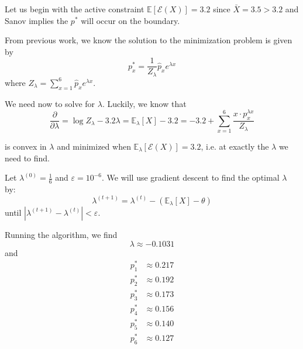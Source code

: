 \documentclass[11pt]{report}
\newcommand{\E}{\mathbb{E}}
\newcommand{\Ec}{\mathcal{E}}
\newcommand{\ep}{\varepsilon}
\newcommand{\abs}[1]{\left\vert #1 \right\vert}
\begin{document}
\begin{enumerate}[1.]
\begin{enumerate}[(a)]
                    Let us begin with the active constraint $\E[\Ec(X)] = 3.2$ since $\bar X = 3.5 > 3.2$ and Sanov implies the $p^*$ will occur on the boundary.

                    From previous work, we know the solution to the minimization problem is given by
                    \[p_x^* = \frac{1}{Z_{\lambda}} \hat p_x e^{\lambda x}\]
                    where $Z_{\lambda} = \sum_{x=1}^6 \hat p_x e^{\lambda x}$.

                    We need now to solve for $\lambda$. Luckily, we know that
                    \[\frac{\partial}{\partial \lambda} = \log Z_{\lambda} - 3.2\lambda = \E_{\lambda}[X] - 3.2 = -3.2 + \sum_{x=1}^{6} \frac{x \cdot p_x^{\lambda x}}{Z_{\lambda}}\]

                    is convex in $\lambda$ and minimized when $\E_{\lambda}[\Ec(X)] = 3.2$, i.e. at exactly the $\lambda$ we need to find.

                    Let $\lambda^{(0)} = \frac{1}{6}$ and $\ep = 10^{-6}$. We will use gradient descent to find the optimal $\lambda$ by:
                    \[\lambda^{(t + 1)} = \lambda^{(t)} - (\E_{\lambda}[X] - \theta)\]
                    until $\abs{\lambda^{(t+1)} - \lambda^{(t)}} < \ep$.

                    Running the algorithm, we find
                    \[\lambda \approx -0.1031\]
                    and
                    \begin{align*}
                        p^*_1 & \approx 0.217 \\
                        p^*_2 & \approx 0.192 \\
                        p^*_3 & \approx 0.173 \\
                        p^*_4 & \approx 0.156 \\
                        p^*_5 & \approx 0.140 \\
                        p^*_6 & \approx 0.127
                    \end{align*}

                    \color{black}



\end{enumerate}
\end{enumerate}
\end{document}
